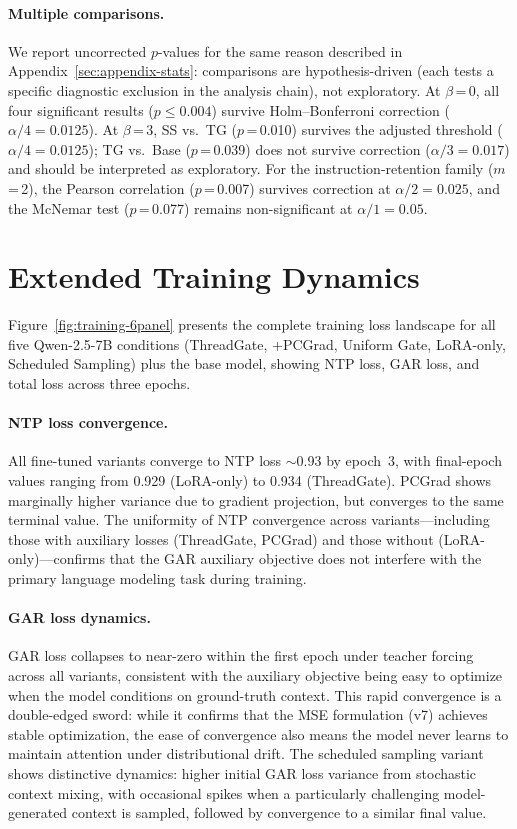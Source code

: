 \paragraph{Multiple comparisons.} We report uncorrected $p$-values for the same reason described in Appendix~\ref{sec:appendix-stats}: comparisons are hypothesis-driven (each tests a specific diagnostic exclusion in the analysis chain), not exploratory. At $\beta$\,=\,0, all four significant results ($p \leq 0.004$) survive Holm--Bonferroni correction ($\alpha/4 = 0.0125$). At $\beta$\,=\,3, SS vs.\ TG ($p$\,=\,0.010) survives the adjusted threshold ($\alpha/4 = 0.0125$); TG vs.\ Base ($p$\,=\,0.039) does not survive correction ($\alpha/3 = 0.017$) and should be interpreted as exploratory. For the instruction-retention family ($m$\,=\,2), the Pearson correlation ($p$\,=\,0.007) survives correction at $\alpha/2 = 0.025$, and the McNemar test ($p$\,=\,0.077) remains non-significant at $\alpha/1 = 0.05$.



\section{Extended Training Dynamics}\label{sec:appendix-training-ext}

Figure~\ref{fig:training-6panel} presents the complete training loss landscape for all five Qwen-2.5-7B conditions (ThreadGate, +PCGrad, Uniform Gate, LoRA-only, Scheduled Sampling) plus the base model, showing NTP loss, GAR loss, and total loss across three epochs.

\paragraph{NTP loss convergence.} All fine-tuned variants converge to NTP loss ${\sim}$0.93 by epoch~3, with final-epoch values ranging from 0.929 (LoRA-only) to 0.934 (ThreadGate). PCGrad shows marginally higher variance due to gradient projection, but converges to the same terminal value. The uniformity of NTP convergence across variants---including those with auxiliary losses (ThreadGate, PCGrad) and those without (LoRA-only)---confirms that the GAR auxiliary objective does not interfere with the primary language modeling task during training.

\paragraph{GAR loss dynamics.} GAR loss collapses to near-zero within the first epoch under teacher forcing across all variants, consistent with the auxiliary objective being easy to optimize when the model conditions on ground-truth context. This rapid convergence is a double-edged sword: while it confirms that the MSE formulation (v7) achieves stable optimization, the ease of convergence also means the model never learns to maintain attention under distributional drift. The scheduled sampling variant shows distinctive dynamics: higher initial GAR loss variance from stochastic context mixing, with occasional spikes when a particularly challenging model-generated context is sampled, followed by convergence to a similar final value.

